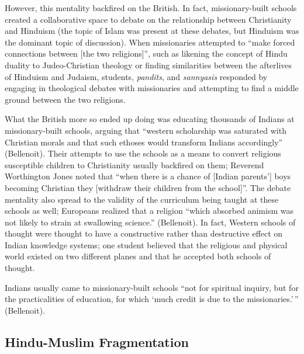 \documentclass[11pt, letterpaper]{article}
\begin{document}
However, this mentality backfired on the British. In fact,
missionary-built schools created a collaborative space to debate on the
relationship between Christianity and Hinduism (the topic of Islam was
present at these debates, but Hinduism was the dominant topic of
discussion). When missionaries attempted to ``make forced connections
between {[}the two religions{]}'', such as likening the concept of Hindu
duality to Judeo-Christian theology or finding similarities between the
afterlives of Hinduism and Judaism, students, \emph{pandits}, and
\emph{sannyasis} responded by engaging in theological debates with
missionaries and attempting to find a middle ground between the two
religions.

What the British more so ended up doing was educating thousands of
Indians at missionary-built schools, arguing that ``western scholarship
was saturated with Christian morals and that such ethoses would
transform Indians accordingly'' (Bellenoit). Their attempts to use the
schools as a means to convert religious susceptible children to
Christianity usually backfired on them; Reverend Worthington Jones noted
that ``when there is a chance of {[}Indian parents'{]} boys becoming
Christian they {[}withdraw their children from the school{]}''. The
debate mentality also spread to the validity of the curriculum being
taught at these schools as well; Europeans realized that a religion
``which absorbed animism was not likely to strain at swallowing
science.'' (Bellenoit). In fact, Western schools of thought were thought
to have a constructive rather than destructive effect on Indian
knowledge systems; one student believed that the religious and physical
world existed on two different planes and that he accepted both schools
of thought.

Indians usually came to missionary-built schools ``not for spiritual
inquiry, but for the practicalities of education, for which `much credit
is due to the missionaries.'\,'' (Bellenoit).

\subsection{Hindu-Muslim
Fragmentation}\label{hindu-muslim-fragmentation}
\end{document}
